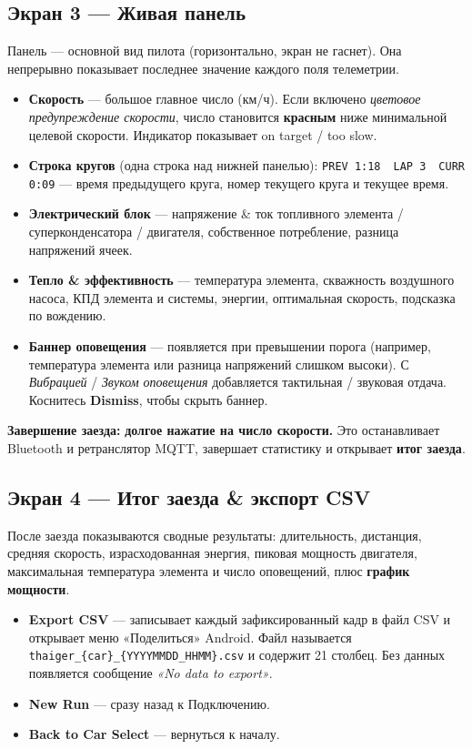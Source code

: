 \documentclass[11pt,a4paper,oneside]{report}
\newcommand{\midsep}{\,\textperiodcentered\,}
\newcommand{\ok}{\textcolor{tgreen}{\ding{51}}}
\newcommand{\nope}{\textcolor{tred}{\ding{55}}}
\newcommand{\code}[1]{\texttt{#1}}
\begin{document}
\subsection{Экран 3 --- Живая панель}
Панель --- основной вид пилота (горизонтально, экран не гаснет). Она непрерывно
показывает последнее значение каждого поля телеметрии.
\begin{itemize}
  \item \textbf{Скорость} --- большое главное число (км/ч). Если включено
    \emph{цветовое предупреждение скорости}, число становится \textbf{красным} ниже
    минимальной целевой скорости. Индикатор показывает \ok{} on target /
    \nope{} too slow.
  \item \textbf{Строка кругов} (одна строка над нижней панелью):
    \code{PREV 1:18} \midsep{} \code{LAP 3} \midsep{} \code{CURR 0:09} --- время
    предыдущего круга, номер текущего круга и текущее время.
  \item \textbf{Электрический блок} --- напряжение \& ток топливного элемента /
    суперконденсатора / двигателя, собственное потребление, разница напряжений
    ячеек.
  \item \textbf{Тепло \& эффективность} --- температура элемента, скважность
    воздушного насоса, КПД элемента и системы, энергии, оптимальная скорость,
    подсказка по вождению.
  \item \textbf{Баннер оповещения} --- появляется при превышении порога (например,
    температура элемента или разница напряжений слишком высоки). С \emph{Вибрацией}
    / \emph{Звуком оповещения} добавляется тактильная / звуковая отдача. Коснитесь
    \textbf{Dismiss}, чтобы скрыть баннер.
\end{itemize}
\begin{tgnote}
\textbf{Завершение заезда:} \textbf{долгое нажатие на число скорости.} Это
останавливает Bluetooth и ретранслятор MQTT, завершает статистику и открывает
\textbf{итог заезда}.
\end{tgnote}

\subsection{Экран 4 --- Итог заезда \& экспорт CSV}
После заезда показываются сводные результаты: длительность, дистанция, средняя
скорость, израсходованная энергия, пиковая мощность двигателя, максимальная
температура элемента и число оповещений, плюс \textbf{график мощности}.
\begin{itemize}
  \item \textbf{Export CSV} --- записывает каждый зафиксированный кадр в файл CSV и
    открывает меню «Поделиться» Android. Файл называется
    \code{thaiger\_\{car\}\_\allowbreak\{YYYYMMDD\_HHMM\}.csv} и содержит 21 столбец.
    Без данных появляется сообщение \emph{«No data to export»}.
  \item \textbf{New Run} --- сразу назад к Подключению.
  \item \textbf{Back to Car Select} --- вернуться к началу.
\end{itemize}
\end{document}
